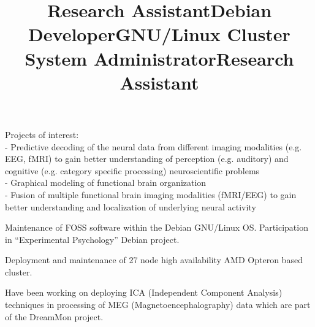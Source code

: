 \documentclass[12pt,overlapped,line]{res}
\begin{document}
\begin{resume}
 \title{Research Assistant}
 \begin{position}
   Projects of interest:\\
   - Predictive decoding of the neural data from different imaging
     modalities (e.g. EEG, fMRI) to gain better understanding of
     perception (e.g. auditory) and cognitive (e.g. category specific
     processing) neuroscientific problems \\
   - Graphical modeling of functional brain organization \\
   - Fusion of multiple functional brain imaging modalities
     (f{MRI}/{EEG}) to gain better understanding and localization of
     underlying neural activity
 \end{position}

\newpage

 \title{Debian Developer}
 \location{}
 \begin{position}
   Maintenance of FOSS software within the Debian GNU/Linux OS.
   Participation in ``Experimental Psychology'' Debian project.
 \end{position}

 \title{GNU/Linux Cluster System Administrator}
 \begin{position}
   Deployment and maintenance of 27 node high availability {AMD}
   {O}pteron based cluster. %
 \end{position}

 \title{Research Assistant}
 \begin{position}
   Have been working  on deploying ICA (Independent Component
   Analysis) techniques in processing of MEG (Magnetoencephalography)
   data which are part of the DreamMon project.


\end{position}
\end{resume}
\end{document}
